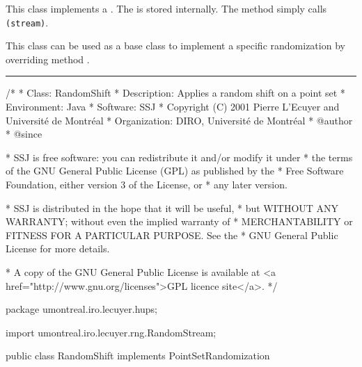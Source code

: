 
This class implements a
.
The  is
stored internally. The method  simply
calls
\texttt{(stream)}.

This class can be used as a base class to implement a specific
randomization by overriding method .

\bigskip\hrule\bigskip

\begin{code}
\begin{hide}
/*
 * Class:        RandomShift
 * Description:  Applies a random shift on a point set
 * Environment:  Java
 * Software:     SSJ 
 * Copyright (C) 2001  Pierre L'Ecuyer and Université de Montréal
 * Organization: DIRO, Université de Montréal
 * @author       
 * @since

 * SSJ is free software: you can redistribute it and/or modify it under
 * the terms of the GNU General Public License (GPL) as published by the
 * Free Software Foundation, either version 3 of the License, or
 * any later version.

 * SSJ is distributed in the hope that it will be useful,
 * but WITHOUT ANY WARRANTY; without even the implied warranty of
 * MERCHANTABILITY or FITNESS FOR A PARTICULAR PURPOSE.  See the
 * GNU General Public License for more details.

 * A copy of the GNU General Public License is available at
   <a href="http://www.gnu.org/licenses">GPL licence site</a>.
 */
\end{hide}
package umontreal.iro.lecuyer.hups;
\begin{hide}
 import umontreal.iro.lecuyer.rng.RandomStream;

\end{hide}
public class RandomShift implements PointSetRandomization\begin{hide} {
   protected RandomStream stream;
\end{hide}
\end{code}
